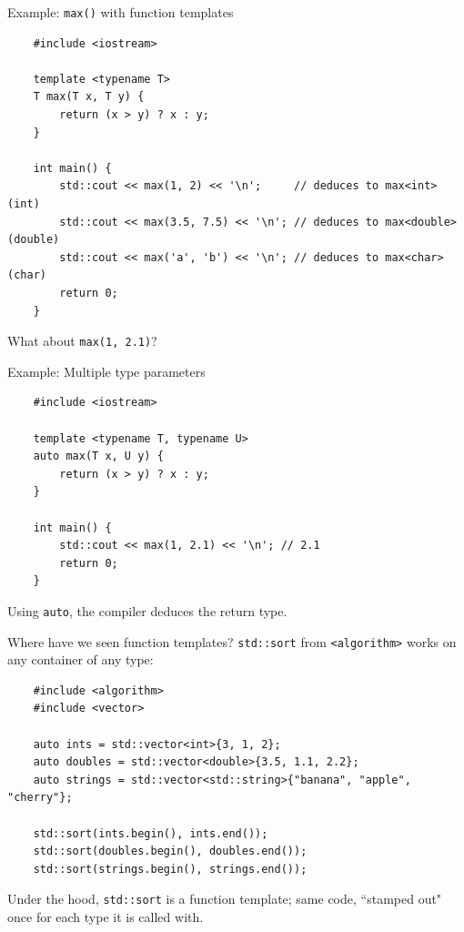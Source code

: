 \begin{frame}[fragile]{Example: \texttt{max()} with function templates}
  \begin{verbatim}
    #include <iostream>

    template <typename T>
    T max(T x, T y) {
        return (x > y) ? x : y;
    }

    int main() {
        std::cout << max(1, 2) << '\n';     // deduces to max<int>(int)
        std::cout << max(3.5, 7.5) << '\n'; // deduces to max<double>(double)
        std::cout << max('a', 'b') << '\n'; // deduces to max<char>(char)
        return 0;
    }
  \end{verbatim}

  What about \texttt{max(1, 2.1)}?
\end{frame}

\begin{frame}[fragile]{Example: Multiple type parameters}
  \begin{verbatim}
    #include <iostream>

    template <typename T, typename U>
    auto max(T x, U y) {
        return (x > y) ? x : y;
    }

    int main() {
        std::cout << max(1, 2.1) << '\n'; // 2.1
        return 0;
    }
  \end{verbatim}

  Using \texttt{auto}, the compiler deduces the return type.
\end{frame}

\begin{frame}[fragile]{Where have we seen function templates?}
  \texttt{std::sort} from \texttt{<algorithm>} works on any container of any type:
  \begin{verbatim}
    #include <algorithm>
    #include <vector>

    auto ints = std::vector<int>{3, 1, 2};
    auto doubles = std::vector<double>{3.5, 1.1, 2.2};
    auto strings = std::vector<std::string>{"banana", "apple", "cherry"};

    std::sort(ints.begin(), ints.end());
    std::sort(doubles.begin(), doubles.end());
    std::sort(strings.begin(), strings.end());
  \end{verbatim}
  Under the hood, \texttt{std::sort} is a function template; same code,
  ``stamped out" once for each type it is called with.
\end{frame}

